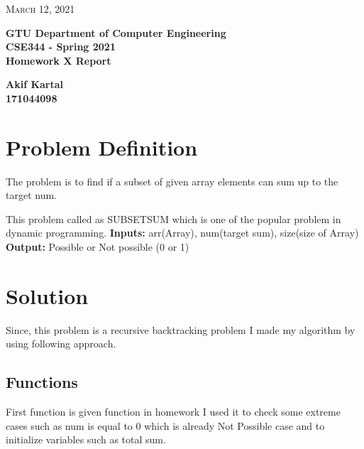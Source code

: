 \documentclass{article}
\begin{document}
\begin{titlepage}

	\begin{flushright}
	\textsc{\large March 12, 2021} \\
	\end{flushright}
	\begin{center}
	\Large{\bfseries GTU Department of Computer Engineering \\ CSE344 - Spring 2021 \\ Homework X Report  } \\
	\end{center}
	\vspace*{\fill}
	\begin{center}
	\Large{\bfseries Akif Kartal \\ 171044098 }
	\end{center}
	\vspace*{\fill}

\end{titlepage}

\cleardoublepage
\section{Problem Definition}
The problem is to find if a subset of given array elements can sum up to the target num. 

This problem called as SUBSETSUM which is one of the popular problem in dynamic
programming.
\textbf{Inputs:} arr(Array), num(target sum), size(size of Array) \\
\textbf{Output:} Possible or Not possible (0 or 1)

\section{Solution}
Since, this problem is a recursive backtracking problem I made my algorithm by using
following approach. \\

\subsection{Functions}
First function is given function in homework I used it to check some extreme cases such as
num is equal to 0 which is already Not Possible case and to initialize variables such as total
sum. \\ \\

	
\end{document}
